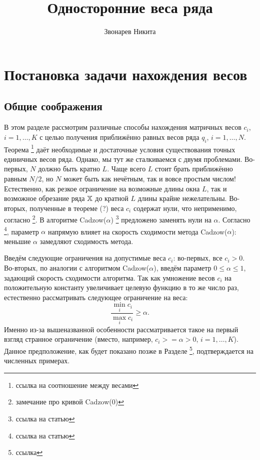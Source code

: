 \documentclass[12pt,a4paper]{article}
\author{Звонарев Никита}
\title{Односторонние веса ряда}
\begin{document}
\maketitle
\section{Постановка задачи нахождения весов}
\subsection{Общие соображения}
В этом разделе рассмотрим различные способы нахождения матричных весов $c_i$, $i = 1, \ldots, K$ с целью получения приближённо равных весов ряда $q_i$, $i = 1, \ldots, N$. Теорема \footnote{ссылка на соотношение между весами} даёт необходимые и достаточные условия существования точных единичных весов ряда. Однако, мы тут же сталкиваемся с двумя проблемами. Во-первых, $N$ должно быть кратно $L$. Чаще всего $L$ стоит брать приближённо равным $N/2$, но $N$ может быть как нечётным, так и вовсе простым числом! Естественно, как резкое ограничение на возможные длины окна $L$, так и возможное обрезание ряда $\mathbb{X}$ до кратной $L$ длины крайне нежелательны. Во-вторых, полученные в теореме (?) веса $c_i$ содержат нули, что неприменимо, согласно \footnote{замечание про кривой Cadzow(0)}. В алгоритме Cadzow($\alpha$) \footnote{ссылка на статью} предложено заменять нули на $\alpha$. Согласно \footnote{ссылка на статью}, параметр $\alpha$ напрямую влияет на скорость сходимости метода Cadzow($\alpha$): меньшие $\alpha$ замедляют сходимость метода.

Введём следующие ограничения на допустимые веса $c_i$: во-первых, все $c_i > 0$. Во-вторых, по аналогии с алгоритмом Cadzow($\alpha$), введём параметр $0 \le \alpha \le 1$, задающий скорость сходимости алгоритма. Так как умножение весов $c_i$ на положительную константу увеличивает целевую функцию в то же число раз, естественно рассматривать следующее ограничение на веса: 
\begin{equation} \label{eq:ratiocond}
\frac{\min_i c_i}{\max_i c_i} \ge \alpha.
\end{equation}
Именно из-за вышеназванной особенности рассматривается такое на первый взгляд странное ограничение (вместо, например, $c_i >= \alpha > 0$, $i = 1, \ldots, K$). Данное предположение, как будет показано позже в Разделе \footnote{ссылка}, подтверждается на численных примерах.
\end{document}
